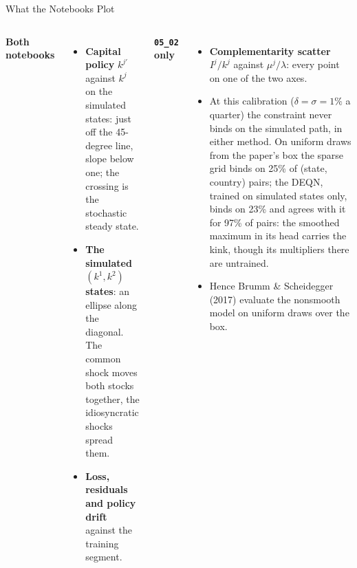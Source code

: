 \documentclass[aspectratio=169,11pt]{beamer}
\begin{document}
\begin{frame}{What the Notebooks Plot}
\footnotesize
\begin{columns}[T]
\textbf{Both notebooks}
\begin{itemize}\itemsep2pt
    \item \textbf{Capital policy} $k^{j\prime}$ against $k^j$ on the simulated states: just off the 45-degree line, slope below one; the crossing is the stochastic steady state.
    \item \textbf{The simulated $(k^1, k^2)$ states}: an ellipse along the diagonal. The common shock moves both stocks together, the idiosyncratic shocks spread them.
    \item \textbf{Loss, residuals and policy drift} against the training segment.
\end{itemize}

\textbf{\texttt{05\_02} only}
\begin{itemize}\itemsep2pt
    \item \textbf{Complementarity scatter} $I^j/k^j$ against $\mu^j/\lambda$: every point on one of the two axes.
    \item At this calibration ($\delta = \sigma = 1\%$ a quarter) the constraint never binds on the simulated path, in either method. On uniform draws from the paper's box the sparse grid binds on 25\% of (state, country) pairs; the DEQN, trained on simulated states only, binds on 23\% and agrees with it for 97\% of pairs: the smoothed maximum in its head carries the kink, though its multipliers there are untrained.
    \item Hence Brumm \& Scheidegger (2017) evaluate the nonsmooth model on uniform draws over the box.
\end{itemize}
\end{columns}
\end{frame}
\end{document}
